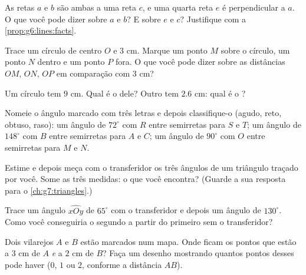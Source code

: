 \begin{exercise}[$\star$]\label{exo:g6:lines:4}
As retas $a$ e $b$ são ambas  a uma reta $c$, e uma
quarta reta $e$ é perpendicular a $a$. O que você pode dizer sobre $a$
e $b$? E sobre $e$ e $c$? Justifique com a
\cref{prop:g6:lines:facts}.
\end{exercise}

\begin{exercise}[$\star$]\label{exo:g6:lines:5}
Trace um círculo de centro $O$ e  $3$ cm. Marque um ponto $M$ sobre
o círculo, um ponto $N$ dentro e um ponto $P$ fora. O que você pode
dizer sobre as distâncias $OM$, $ON$, $OP$ em comparação com $3$ cm?
\end{exercise}

\begin{exercise}[$\star$]\label{exo:g6:lines:6}
Um círculo tem  $9$ cm. Qual é o  dele? Outro tem 
$2.6$ cm: qual é o ?
\end{exercise}

\begin{exercise}[$\star$]\label{exo:g6:lines:7}
Nomeie o ângulo marcado com três letras e depois classifique-o (agudo,
reto, obtuso, raso): um ângulo de $72^\circ$ com  $R$ entre
semirretas para $S$ e $T$; um ângulo de $148^\circ$ com  $B$
entre semirretas para $A$ e $C$; um ângulo de $90^\circ$ com 
$O$ entre semirretas para $M$ e $N$.
\end{exercise}

\begin{exercise}[$\star$]\label{exo:g6:lines:8}
Estime e depois meça com o transferidor os três ângulos de um triângulo
traçado por você. Some as três medidas: o que você encontra? (Guarde a
sua resposta para o \cref{ch:g7:triangles}.)
\end{exercise}

\begin{exercise}[$\star$]\label{exo:g6:lines:9}
Trace um ângulo $\widehat{xOy}$ de $65^\circ$ com o transferidor e
depois um ângulo de $130^\circ$. Como você conseguiria o segundo a
partir do primeiro sem o transferidor?
\end{exercise}

\begin{exercise}[$\star\star$]\label{exo:g6:lines:10}
Dois vilarejos $A$ e $B$ estão marcados num mapa. Onde ficam os pontos
que estão a $3$ cm de $A$ \emph{e} a $2$ cm de $B$? Faça um desenho
mostrando quantos pontos desses pode haver ($0$, $1$ ou $2$, conforme a
distância $AB$).
\end{exercise}

